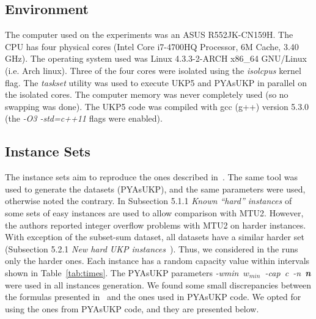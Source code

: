 \documentclass[runningheads,a4paper]{llncs}
\begin{document}
\subsection{Environment}

The computer used on the experiments was an ASUS R552JK-CN159H. The CPU has four physical cores (Intel Core i7-4700HQ Processor, 6M Cache, 3.40 GHz). 
The operating system used was Linux 4.3.3-2-ARCH x86\_64 GNU/Linux (i.e. Arch linux). 
Three of the four cores were isolated using the \emph{isolcpus} kernel flag. 
The \emph{taskset} utility was used to execute UKP5 and PYAsUKP in parallel on the isolated cores. 
The computer memory was never completely used (so no swapping was done). 
The UKP5 code was compiled with gcc (g++) version 5.3.0 (the \emph{-O3 -std=c++11} flags were enabled).

\subsection{Instance Sets}

The instance sets aim to reproduce the ones described in~\cite{pya}. 
The same tool was used to generate the datasets (PYAsUKP), and the same parameters were used, otherwise noted the contrary. 
In Subsection 5.1.1 \emph{Known ``hard'' instances} of~\cite{pya} some sets of easy instances are used to allow comparison with MTU2. 
However, the authors reported integer overflow problems with MTU2 on harder instances. 
With exception of the subset-sum dataset, all datasets have a similar harder set (Subsection 5.2.1 \emph{New hard UKP instances}~\cite{pya}).
Thus, we considered in the runs only the harder ones. 
Each instance has a random capacity value within intervals shown in Table~\ref{tab:times}. 
The PYAsUKP parameters \mbox{\emph{-wmin \(w_{min}\) -cap c -n \textbf{n}}} were used in all instances generation. 
We found some small discrepancies between the formulas presented in~\cite{pya} and the ones used in PYAsUKP code.
We opted for using the ones from  PYAsUKP code, and they are presented below.
\end{document}
